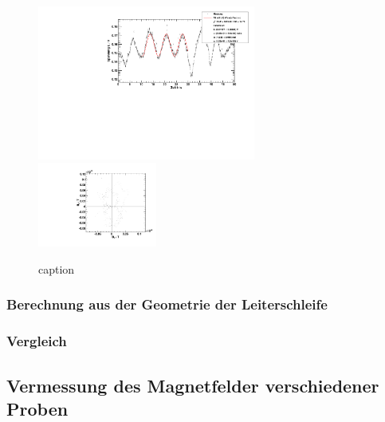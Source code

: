 \begin{figure}[H]
\begin{center}
  \includegraphics[width=0.64\textwidth]{../img/fit_Spule_R5_1.pdf}
  \includegraphics[width=0.35\textwidth]{../img/polar_Spule_R5_1.pdf}
  \caption{caption}
  \label{img:R5}
\end{center}
\end{figure}

\subsubsection{Berechnung aus der Geometrie der Leiterschleife}

\subsubsection{Vergleich}

\subsection{Vermessung des Magnetfelder verschiedener Proben}
